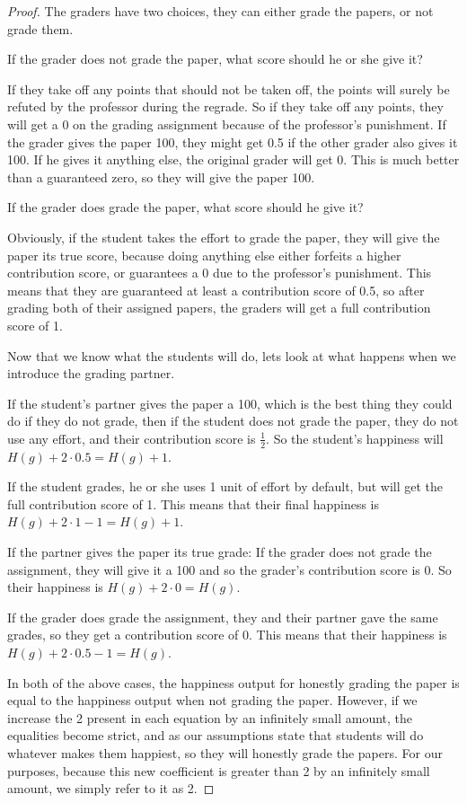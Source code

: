 \documentclass[12pt, Arial]{article}
\begin{document}
\begin{proof}
The graders have two choices, they can either grade the papers, or not grade them.

If the grader does not grade the paper, what score should he or she give it?

If they take off any points that should not be taken off, the points will surely be refuted by the professor during the regrade.
So if they take off any points, they will get a 0 on the grading assignment because of the professor's punishment.
If the grader gives the paper 100, they might get 0.5 if the other grader also gives it 100. If he gives it anything else, the original grader will get 0. This is much better than a guaranteed zero, so they will give the paper 100.

If the grader does grade the paper, what score should he give it?

Obviously, if the student takes the effort to grade the paper, they will give the paper its true score, because doing anything else either forfeits a higher contribution score, or guarantees a 0 due to the professor's punishment. This means that they are guaranteed at least a contribution score of 0.5, so after grading both of their assigned papers, the graders will get a full contribution score of 1.

Now that we know what the students will do, lets look at what happens when we introduce the grading partner. 

If the student's partner gives the paper a 100, which is the best thing they could do if they do not grade, then
	if the student does not grade the paper, they do not use any effort, and their contribution score is $\frac{1}{2}$. So the student's happiness will $H(g) + 2\cdot0.5 = H(g)+1$.

If the student grades, he or she uses 1 unit of effort by default, but will get the full contribution score of 1. This means that their final happiness is $H(g) + 2\cdot1 - 1 = H(g)+1$.
	
If the partner gives the paper its true grade:
	If the grader does not grade the assignment, they will give it a 100 and so the grader's contribution score is 0. So their happiness is $H(g) + 2\cdot0 = H(g)$.

If the grader does grade the assignment, they and their partner gave the same grades, so they get a contribution score of 0. This means that their happiness is $H(g) + 2\cdot0.5 - 1 = H(g)$.
	
In both of the above cases, the happiness output for honestly grading the paper is equal to the happiness output when not grading the paper. However, if we increase the 2 present in each equation by an infinitely small amount, the equalities become strict, and as our assumptions state that students will do whatever makes them happiest, so they will honestly grade the papers. For our purposes, because this new coefficient is greater than 2 by an infinitely small amount, we simply refer to it as 2.

\end{proof}
\end{document}
